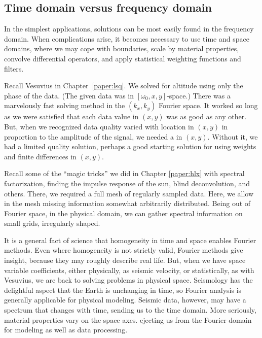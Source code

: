 \subsection{Time domain versus frequency domain}
\par
In the simplest applications, solutions can be most easily found
in the frequency domain.
When complications arise,
it becomes necessary to use time and space domains,
where we may cope with boundaries,
scale by material properties,
convolve differential operators,
and apply statistical weighting functions and filters.
\par
Recall Vesuvius in Chapter~\ref{paper:lsq}.
We solved for altitude using only the phase of the data.
(The given data was in $[\omega_0,x,y]$-space.)
There was a marvelously fast solving method in the $(k_x,k_y)$ Fourier space.
It worked so long as we were satisfied
that each data value in $(x,y)$ was as good as any other.
But,
when we recognized data quality varied with location in $(x,y)$
in proportion to the amplitude of the signal,
we needed a
in $(x,y)$.
Without it,
we had a limited quality solution,
perhaps a good starting solution
for using weights and finite differences in $(x,y)$.
\par
Recall some of the ``magic tricks'' we did in Chapter \ref{paper:hlx}
with spectral factorization, finding the impulse response of the sun,
blind deconvolution, and others.
There,
we required a full mesh of regularly sampled data.
Here,
we allow in the mesh missing information somewhat arbitrarily distributed.
Being out of Fourier space, in the physical domain,
we can gather spectral information on small grids, irregularly shaped.
\par
It is a general fact of science that
homogeneity in time and space enables Fourier methods.
Even where homogeneity is not strictly valid, Fourier methods give insight,
because they may roughly describe real life.
But,
when we have space variable coefficients,
either physically, as seismic velocity,
or statistically, as with Vesuvius,
we are back to solving problems in physical space.
Seismology has the delightful aspect that the Earth is unchanging in time,
so Fourier analysis is generally applicable for physical modeling.
Seismic data, however,
may have a spectrum that changes with time,
sending us to the time domain.
More seriously, material properties vary on the space axes.
ejecting us from the Fourier domain for modeling as well as data processing.

